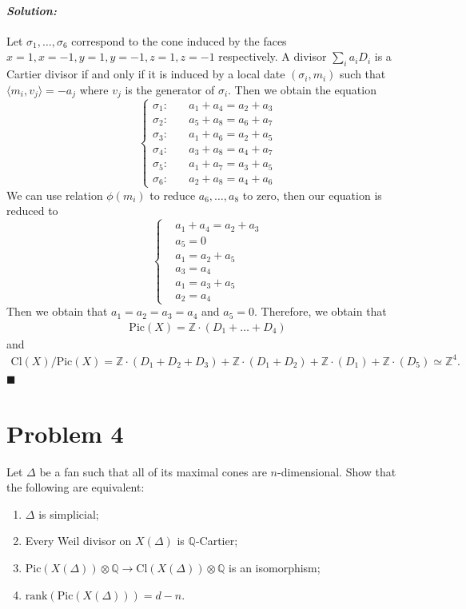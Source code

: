 \documentclass[12pt, a4paper]{article}
\newenvironment{solution}
  {\paragraph{\textit{Solution:}}\par\medskip}
  {\hfill$\blacksquare$\vspace{0.1cm}}
\begin{document}
\begin{solution}
Let $\sigma_1,\dots,\sigma_6$ correspond to the cone induced by the faces $x=1,x=-1,y=1,y=-1,z=1,z=-1$ respectively.
A divisor $\sum_{i}a_i D_i$ is a Cartier divisor if and only if it is induced by a local date $(\sigma_i,m_i)$ such that $\langle m_i, v_j\rangle=-a_j$ where $v_j$ is the generator of $\sigma_i$. 
Then we obtain the equation
$$\left\{
\begin{aligned}
    \sigma_1: & \quad a_1 + a_4 = a_2 + a_3 \\
    \sigma_2: & \quad a_5 + a_8 = a_6 + a_7 \\
   \sigma_3: & \quad a_1 + a_6 = a_2 + a_5 \\
    \sigma_4: & \quad a_3 + a_8 = a_4 + a_7 \\
    \sigma_5: & \quad a_1 + a_7 = a_3 + a_5 \\
    \sigma_6: & \quad a_2 + a_8 = a_4 + a_6
\end{aligned}
\right.$$
We can use relation $\phi(m_i)$ to reduce $a_6,\dots,a_8$ to zero, then our equation is reduced to
$$\left\{
\begin{aligned}
    &a_1 + a_4 = a_2 + a_3 \\
    &a_5 = 0 \\
    &a_1  = a_2 + a_5 \\
    &a_3 = a_4 \\
    &a_1  = a_3 + a_5 \\
    &a_2  = a_4 
\end{aligned}
\right.$$
Then we obtain that $a_1=a_2=a_3=a_4$ and $a_5=0$. Therefore, we obtain that 
\begin{align*}
    \text{Pic}(X) = \mathbb{Z}\cdot(D_1+\dots+D_4)
\end{align*}
and 
\begin{align*}
    \text{Cl}(X)/\text{Pic}(X) =\mathbb{Z}\cdot(D_1+D_2+D_3) + \mathbb{Z}\cdot(D_1+D_2)+ \mathbb{Z}\cdot(D_1)+\mathbb{Z}\cdot(D_5)\simeq \mathbb{Z}^4.
\end{align*}
\end{solution}




\section*{Problem 4}
Let $\Delta$ be a fan such that all of its maximal cones are $n$-dimensional. Show that the following are equivalent:
\begin{enumerate}
    \item $\Delta$ is simplicial;
    \item Every Weil divisor on $X(\Delta)$ is $\mathbb{Q}$-Cartier;
    \item $\text{Pic}(X(\Delta)) \otimes \mathbb{Q} \longrightarrow \text{Cl}(X(\Delta)) \otimes \mathbb{Q}$ is an isomorphism;
    \item $\text{rank}(\text{Pic}(X(\Delta))) = d - n$.
\end{enumerate}
\end{document}
